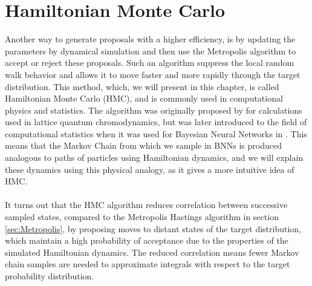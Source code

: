 \section{Hamiltonian Monte Carlo}
Another way to generate proposals with a higher efficiency, is by updating the parameters by dynamical simulation and then use the Metropolis algorithm to accept or reject these proposals. Such an algorithm suppress the local random walk behavior and allows it to move faster and more rapidly through the target distribution. This method, which, we will present in this chapter, is called Hamiltonian Monte Carlo (HMC), and is commonly used in computational physics and statistics. The algorithm was originally proposed by \cite{Duane1987216} for calculations used in lattice quantum chromodynamics, but was later introduced to the field of computational statistics when it was used for Bayesian Neural Networks in \cite{neal2012bayesian}. This means that the Markov Chain from which we sample in BNNs is produced analogous to paths of particles using Hamiltonian dynamics, and we will explain these dynamics using this physical analogy, as it gives a more intuitive idea of HMC.
\\
\\
It turns out that the HMC algorithm reduces correlation between successive sampled states, compared to the Metropolis Hastings algorithm in section \ref{sec:Metropolis}, by proposing moves to distant states of the target distribution, which maintain a high probability of acceptance due to the properties of the simulated Hamiltonian dynamics. The reduced correlation means fewer Markov chain samples are needed to approximate integrals with respect to the target probability distribution.

